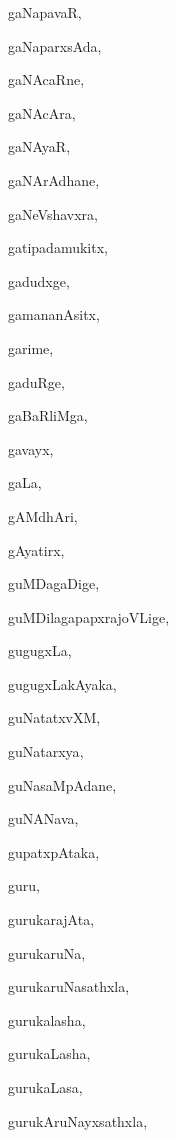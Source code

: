 \begin{multicols}{2}
{gaNapavaR}, \pageref{gaNapavaR}

{gaNaparxsAda}, \pageref{gaNaparxsAda}

{gaNAcaRne}, \pageref{gaNAcaRne}

{gaNAcAra}, \pageref{gaNAcAra}

{gaNAyaR}, \pageref{gaNAyaR}

{gaNArAdhane}, \pageref{gaNArAdhane}

{gaNeVshavxra}, \pageref{gaNeVshavxra}

{gatipadamukitx}, \pageref{gatipadamukitx}

{gadudxge}, \pageref{gadudxge}

{gamananAsitx}, \pageref{gamananAsitx}

{garime}, \pageref{garime}

{gaduRge}, \pageref{gaduRge}

{gaBaRliMga}, \pageref{gaBaRliMga}

{gavayx}, \pageref{gavayx}

{gaLa}, \pageref{gaLa}

{gAMdhAri}, \pageref{gAMdhAri}

{gAyatirx}, \pageref{gAyatirx}

{guMDagaDige}, \pageref{guMDagaDige}

{guMDilagapapxrajoVLige}, \pageref{guMDilagapapxrajoVLige}

{gugugxLa}, \pageref{gugugxLa}

{gugugxLakAyaka}, \pageref{gugugxLakAyaka}

{guNatatxvXM}, \pageref{guNatatxvXM}

{guNatarxya}, \pageref{guNatarxya}

{guNasaMpAdane}, \pageref{guNasaMpAdane}

{guNANava}, \pageref{guNANava}

{gupatxpAtaka}, \pageref{gupatxpAtaka}

{guru}, \pageref{guru}

{gurukarajAta}, \pageref{gurukarajAta}

{gurukaruNa}, \pageref{gurukaruNa}

{gurukaruNasathxla}, \pageref{gurukaruNasathxla}

{gurukalasha}, \pageref{gurukalasha}

{gurukaLasha}, \pageref{gurukaLasha}

{gurukaLasa}, \pageref{gurukaLasa}

{gurukAruNayxsathxla}, \pageref{gurukAruNayxsathxla}


\end{multicols}
